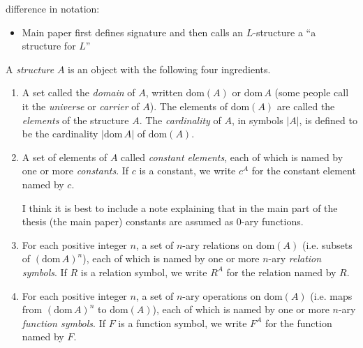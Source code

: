 \begin{mynote}
    difference in notation:
    \begin{itemize}
        \item Main paper first defines signature and then calls an \(L\)-structure a ``a structure for \(L\)''
    \end{itemize}
\end{mynote}
\begin{definition}[Structure]

    A \emph{structure} \( A \) is an object with the following four ingredients.

    \begin{enumerate}
        \item[(1.1)] A set called the \emph{domain} of \( A \), written \( \mathrm{dom}(A) \) or \( \mathrm{dom}\,A \) (some people call it the \emph{universe} or \emph{carrier} of \( A \)). The elements of \( \mathrm{dom}(A) \) are called the \emph{elements} of the structure \( A \). The \emph{cardinality} of \( A \), in symbols \( |A| \), is defined to be the cardinality \( |\mathrm{dom}\,A| \) of \( \mathrm{dom}(A) \).

        \item[(1.2)] A set of elements of \( A \) called \emph{constant elements}, each of which is named by one or more \emph{constants}. If \( c \) is a constant, we write \( c^A \) for the constant element named by \( c \).

              \begin{mynote}
                  I think it is best to include a note explaining that in the main part of the thesis (the main paper) constants are assumed as \(0\)-ary functions.
              \end{mynote}


        \item[(1.3)] For each positive integer \( n \), a set of \( n \)-ary relations on \( \mathrm{dom}(A) \) (i.e. subsets of \( (\mathrm{dom}\,A)^n \)), each of which is named by one or more \( n \)-ary \emph{relation symbols}. If \( R \) is a relation symbol, we write \( R^A \) for the relation named by \( R \).

        \item[(1.4)] For each positive integer \( n \), a set of \( n \)-ary operations on \( \mathrm{dom}(A) \) (i.e. maps from \( (\mathrm{dom}\,A)^n \) to \( \mathrm{dom}(A) \)), each of which is named by one or more \( n \)-ary \emph{function symbols}. If \( F \) is a function symbol, we write \( F^A \) for the function named by \( F \).
    \end{enumerate}


\end{definition}



